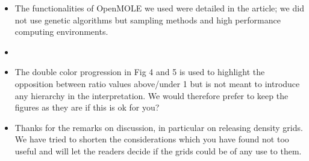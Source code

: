 \documentclass[11pt,a4paper,sans]{moderncv}        %
\begin{document}
\begin{itemize}
	\item The functionalities of OpenMOLE we used were detailed in the article; we did not use genetic algorithms but sampling methods and high performance computing environments.
	
	\item {}
	
    \item The double color progression in Fig 4 and 5 is used to highlight the opposition between ratio values above/under 1 but is not meant to introduce any hierarchy in the interpretation. We would therefore prefer to keep the figures as they are if this is ok for you?
   	
	\item Thanks for the remarks on discussion, in particular on releasing density grids. We have tried to shorten the considerations which you have found not too useful and will let the readers decide if the grids could be of any use to them.
\end{itemize}
\end{document}
